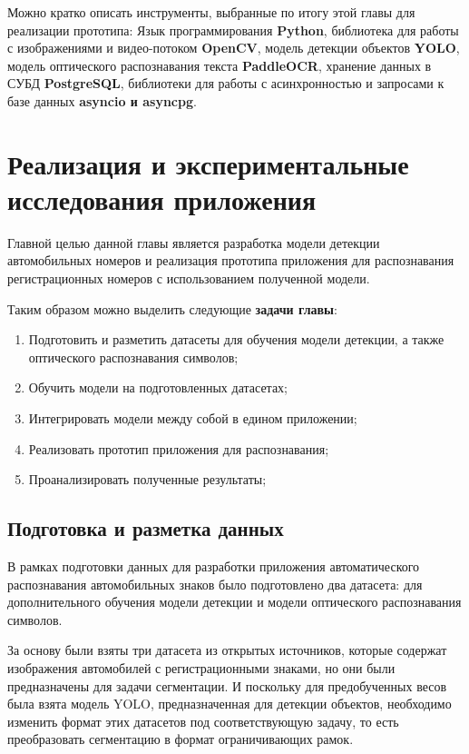 \documentclass[a4paper,12pt]{article}
\begin{document}
Можно кратко описать инструменты, выбранные по итогу этой главы для реализации прототипа:
Язык программирования \textbf{Python}, библиотека для работы с изображениями и видео-потоком \textbf{OpenCV}, модель детекции объектов \textbf{YOLO}, модель оптического распознавания текста \textbf{PaddleOCR}, хранение данных в СУБД \textbf{PostgreSQL}, библиотеки для работы с асинхронностью и запросами к базе данных \textbf{asyncio и asyncpg}.


\newpage
\section{Реализация и экспериментальные исследования приложения}

Главной целью данной главы является разработка модели детекции автомобильных номеров и реализация прототипа приложения для распознавания регистрационных номеров с использованием полученной модели.

Таким образом можно выделить следующие \textbf{задачи главы}:
\begin{enumerate}
    \item Подготовить и разметить датасеты для обучения модели детекции, а также оптического распознавания символов;
    \item Обучить модели на подготовленных датасетах;
    \item Интегрировать модели между собой в едином приложении;
    \item Реализовать прототип приложения для распознавания;
    \item Проанализировать полученные результаты;
\end{enumerate}

\subsection{Подготовка и разметка данных}

В рамках подготовки данных для разработки приложения автоматического распознавания автомобильных знаков было подготовлено два датасета: для дополнительного обучения модели детекции и модели оптического распознавания символов.

За основу были взяты три датасета из открытых источников, которые содержат изображения автомобилей с регистрационными знаками, но они были предназначены для задачи сегментации. И поскольку для предобученных весов была взята модель YOLO, предназначенная для детекции объектов, необходимо изменить формат этих датасетов под соответствующую задачу, то есть преобразовать сегментацию в формат ограничивающих рамок.
\end{document}
